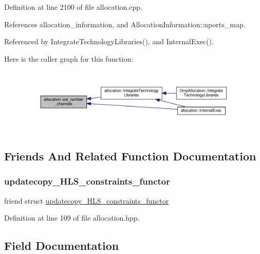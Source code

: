 Definition at line 2100 of file allocation.\+cpp.



References allocation\+\_\+information, and Allocation\+Information\+::nports\+\_\+map.



Referenced by Integrate\+Technology\+Libraries(), and Internal\+Exec().

Here is the caller graph for this function\+:
\nopagebreak
\begin{figure}[H]
\begin{center}
\leavevmode
\includegraphics[width=350pt]{d0/d74/classallocation_a6f4d2a8b3457f7ff1751b08154dfa0b7_icgraph}
\end{center}
\end{figure}


\subsection{Friends And Related Function Documentation}
\mbox{\label{classallocation_ae62048173f29362c5fb37b7b34b40f59}} 
\subsubsection{\texorpdfstring{updatecopy\+\_\+\+H\+L\+S\+\_\+constraints\+\_\+functor}{updatecopy\_HLS\_constraints\_functor}}
{\footnotesize\ttfamily friend struct \hyperlink{structupdatecopy__HLS__constraints__functor}{updatecopy\+\_\+\+H\+L\+S\+\_\+constraints\+\_\+functor}\hspace{0.3cm}{\ttfamily [friend]}}



Definition at line 109 of file allocation.\+hpp.



\subsection{Field Documentation}
\mbox{\label{classallocation_a6f1b3fd4ce46389216d316e91fd5e3ff}} 
